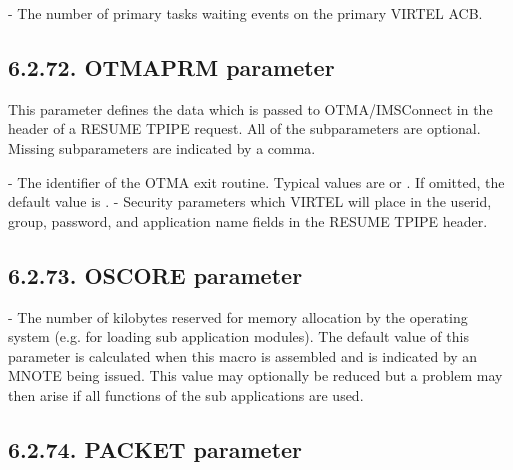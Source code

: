 \documentclass[letterpaper,10pt,english]{sphinxmanual}
\begin{document}
 - The number of primary tasks waiting events on the primary VIRTEL ACB.


\subsection{6.2.72. OTMAPRM parameter}
\label{\detokenize{Installation_Guide:otmaprm-parameter}}
\begin{sphinxVerbatim}[commandchars=\\\{\}]
 
\end{sphinxVerbatim}

This parameter defines the data which is passed to OTMA/IMSConnect in the header of a RESUME TPIPE request. All of the subparameters are optional. Missing subparameters are indicated by a comma.

 - The identifier of the OTMA exit routine. Typical values are  or . If omitted, the default value is .
 - Security parameters which VIRTEL will place in the userid, group, password, and application name fields in the RESUME TPIPE header.


\subsection{6.2.73. OSCORE parameter}
\label{\detokenize{Installation_Guide:oscore-parameter}}
\begin{sphinxVerbatim}[commandchars=\\\{\}]
 
\end{sphinxVerbatim}

 - The number of kilobytes reserved for memory allocation by the operating system (e.g. for loading sub application modules). The default value of this parameter is calculated when this macro is assembled and is indicated by an MNOTE being issued. This value may optionally be reduced but a problem may then arise if all functions of the sub applications are used.


\subsection{6.2.74. PACKET parameter}
\label{\detokenize{Installation_Guide:packet-parameter}}
\begin{sphinxVerbatim}[commandchars=\\\{\}]
 
\end{sphinxVerbatim}
\end{document}
